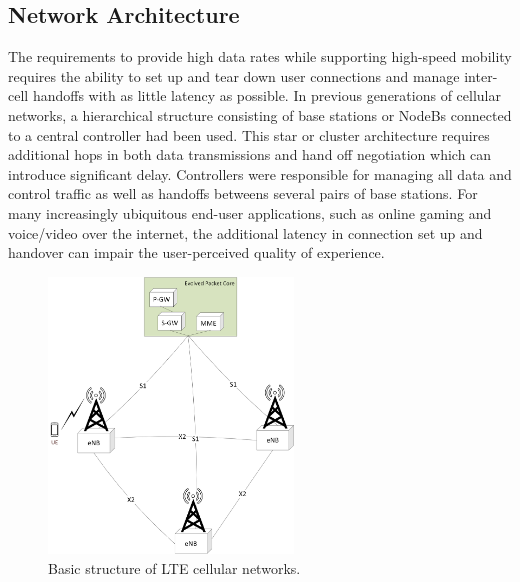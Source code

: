 \subsection{Network Architecture}
\label{net-arch}
The requirements to provide high data rates while supporting high-speed mobility requires the ability to set up and tear down user connections and manage inter-cell handoffs with as little latency as possible.  In previous generations of cellular networks, a hierarchical structure consisting of base stations or NodeBs connected to a central controller had been used.  This star or cluster architecture requires additional hops in both data transmissions and hand off negotiation which can introduce significant delay.  Controllers were responsible for managing all data and control traffic as well as handoffs betweens several pairs of base stations.  For many increasingly ubiquitous end-user applications, such as online gaming and voice/video over the internet, the additional latency in connection set up and handover can impair the user-perceived quality of experience.
\begin{figure}[!ht]
	\centering
	\includegraphics[width=0.58\textwidth]{figures3/lteAnet}
	\caption{Basic structure of LTE cellular networks.}
	\label{figs:LTE-A-Network}
\end{figure}


